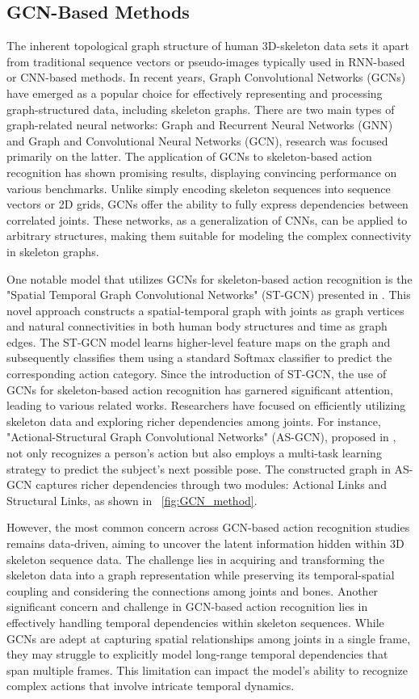\subsection{GCN-Based Methods}
The inherent topological graph structure of human 3D-skeleton data sets it apart from traditional sequence vectors or pseudo-images typically used in RNN-based or CNN-based methods. In recent years, Graph Convolutional Networks (GCNs) have emerged as a popular choice for effectively representing and processing graph-structured data, including skeleton graphs. There are two main types of graph-related neural networks: Graph and Recurrent Neural Networks (GNN) and Graph and Convolutional Neural Networks (GCN), research was focused primarily on the latter. The application of GCNs to skeleton-based action recognition has shown promising results, displaying convincing performance on various benchmarks. Unlike simply encoding skeleton sequences into sequence vectors or 2D grids, GCNs offer the ability to fully express dependencies between correlated joints. These networks, as a generalization of CNNs, can be applied to arbitrary structures, making them suitable for modeling the complex connectivity in skeleton graphs.

One notable model that utilizes GCNs for skeleton-based action recognition is the "Spatial Temporal Graph Convolutional Networks" (ST-GCN) presented in \cite{yan2018spatial}. This novel approach constructs a spatial-temporal graph with joints as graph vertices and natural connectivities in both human body structures and time as graph edges. The ST-GCN model learns higher-level feature maps on the graph and subsequently classifies them using a standard Softmax classifier to predict the corresponding action category. Since the introduction of ST-GCN, the use of GCNs for skeleton-based action recognition has garnered significant attention, leading to various related works. Researchers have focused on efficiently utilizing skeleton data and exploring richer dependencies among joints. For instance, "Actional-Structural Graph Convolutional Networks" (AS-GCN), proposed in \cite{li2019actional}, not only recognizes a person's action but also employs a multi-task learning strategy to predict the subject's next possible pose. The constructed graph in AS-GCN captures richer dependencies through two modules: Actional Links and Structural Links, as shown in ~\ref{fig:GCN_method}.

However, the most common concern across GCN-based action recognition studies remains data-driven, aiming to uncover the latent information hidden within 3D skeleton sequence data. The challenge lies in acquiring and transforming the skeleton data into a graph representation while preserving its temporal-spatial coupling and considering the connections among joints and bones. Another significant concern and challenge in GCN-based action recognition lies in effectively handling temporal dependencies within skeleton sequences. While GCNs are adept at capturing spatial relationships among joints in a single frame, they may struggle to explicitly model long-range temporal dependencies that span multiple frames. This limitation can impact the model's ability to recognize complex actions that involve intricate temporal dynamics.

